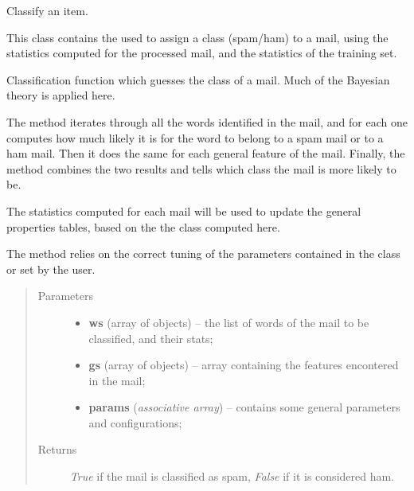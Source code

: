 \documentclass[letterpaper,10pt,english]{sphinxmanual}
\begin{document}
\begin{fulllineitems}
\label{index:classifier.Classifier}
Classify an item.

This class contains the {\hyperref[index:classifier.Classifier.classify]{}} used to
assign a class (spam/ham) to a mail, using the statistics computed
for the processed mail, and the statistics of the training set.

\begin{fulllineitems}
\label{index:classifier.Classifier.classify}
Classification function which guesses the class of a mail. Much of the
Bayesian theory is applied here.

The method iterates through all the words identified in the mail,
and for each one computes how much likely it is for the word to belong
to a spam mail or to a ham mail. Then it does the same for each general
feature of the mail. Finally, the method combines the two results
and tells which class the mail is more likely to be.

The statistics computed for each mail will be used to update the
general properties tables, based on the the class computed here.

The method relies on the correct tuning of the parameters contained in
the {\hyperref[index:config.Config]{}} class or set by the user.
\begin{quote}\begin{description}
\item[{Parameters}] \leavevmode\begin{itemize}
\item {} 
\textbf{ws} (array of {\hyperref[index:test_stat.Test_word]{}} objects) -- the list of words of the mail to be classified, and their stats;

\item {} 
\textbf{gs} (array of {\hyperref[index:test_stat.Test_stat]{}} objects) -- array containing the features encontered in the mail;

\item {} 
\textbf{params} (\emph{associative array}) -- contains some general parameters and configurations;

\end{itemize}

\item[{Returns}] \leavevmode
\emph{True} if the mail is classified as spam, \emph{False} if it is            considered ham.

\end{description}\end{quote}

\end{fulllineitems}


\end{fulllineitems}
\end{document}

